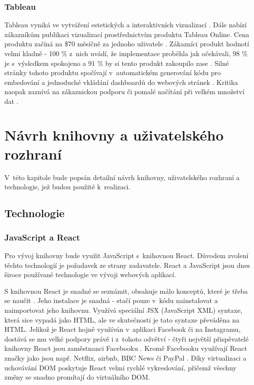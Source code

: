 \documentclass[czech, bc, kiv, he, iso690numb, viewonly]{fasthesis} %
\begin{document}
\subsection{Tableau}
Tableau vyniká ve vytváření estetických a interaktivních vizualizací \cite{tableauBlog}. Dále nabízí zákazníkům publikaci vizualizací prostřednictvím produktu Tableau Online. Cena produktu začíná na \$70 měsíčně za jednoho uživatele \cite{trustRadiusTableAU}. 
Zákazníci produkt hodnotí velmi kladně - 100 \% z~nich uvádí, že implementace proběhla jak očekávali, 98 \% je s~výsledkem spokojeno a 91 \% by si tento produkt zakoupilo zase \cite{trustRadiusTableAU}. Silné stránky 
tohoto produktu spočívají v~automatickém generování kódu pro embedování a jednoduché vkládání dashboardů do webových stránek \cite{tableauBlog}. Kritika naopak zaznívá na zákaznickou podporu či pomalé načítání při velkém množství dat \cite{trustRadiusTableAU}.

%
%
%
%
\chapter{Návrh knihovny a uživatelského rozhraní}

V~této kapitole bude popsán detailní návrh knihovny, uživatelského rozhraní a technologie, jež budou použité k~realizaci. 

\section{Technologie}

\subsection{JavaScript a React}
Pro vývoj knihovny bude využit JavaScript s~knihovnou React. Důvodem zvolení těchto technologií je požadavek ze strany zadavatele. React a JavaScript jsou dnes
široce používané technologie ve vývoji webových aplikací. 

S knihovnou React je snadné se seznámit, obsahuje málo konceptů, které je třeba se naučit \cite{whyUsingReact}. Jeho instalace je snadná -
stačí pouze v~kódu nainstalovat a naimportovat jeho knihovnu. Využívá speciální JSX (JavaScript XML) syntaxe, která sice vypadá jako HTML, ale ve skutečnosti je tato syntaxe převáděna na HTML. Jelikož je React hojně využíván
v~aplikaci Facebook či na Instagramu, dostává se mu velké podpory právě i z~tohoto odvětví - čtyři největší přispěvatelé knihovny React jsou zaměstnanci Facebooku \cite{whyUsingReact}. Kromě 
Facebooku využívají React značky jako jsou např. Netflix, airbnb, BBC News či PayPal \cite{whyUsingReact2}. Díky virtualizaci a uchovávání DOM poskytuje React
velmi rychlé vykreslování, přičemž všechny změny se snadno promítají do virtuálního DOM. 
\end{document}
